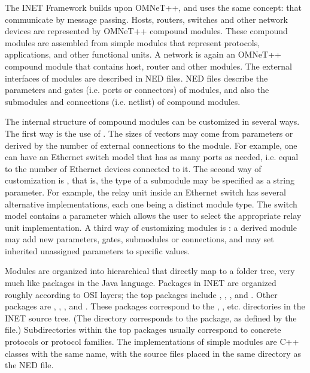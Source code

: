 The INET Framework builds upon OMNeT++, and uses the same concept:
 that communicate by message passing. Hosts, routers, switches
and other network devices are represented by OMNeT++ compound modules.
These compound modules are assembled from simple modules that represent
protocols, applications, and other functional units. A network is again an
OMNeT++ compound module that contains host, router and other modules. The
external interfaces of modules are described in NED files. NED files
describe the parameters and gates (i.e. ports or connectors) of modules,
and also the submodules and connections (i.e. netlist) of compound modules.

The internal structure of compound modules can be customized in several
ways. The first way is the use of .
The sizes of vectors may come from parameters or derived by the number of
external connections to the module. For example, one can have an Ethernet
switch model that has as many ports as needed, i.e. equal to the number of
Ethernet devices connected to it. The second way of customization is
, that is, the type of a submodule may be specified
as a string parameter. For example, the relay unit inside an Ethernet
switch has several alternative implementations, each one being a distinct
module type. The switch model contains a parameter which allows the user to
select the appropriate relay unit implementation. A third way of
customizing modules is : a derived module may add new
parameters, gates, submodules or connections, and may set inherited
unassigned parameters to specific values.

Modules are organized into hierarchical  that directly map to
a folder tree, very much like packages in the Java language. Packages in
INET are organized roughly according to OSI layers; the top packages
include , ,
, and . Other packages are
, , ,  and
. These packages correspond to the ,
, etc. directories in the INET source tree. (The
 directory corresponds to the  package, as defined by
the  file.) Subdirectories within the top packages
usually correspond to concrete protocols or protocol families. The
implementations of simple modules are C++ classes with the same name, with
the source files placed in the same directory as the NED file.

